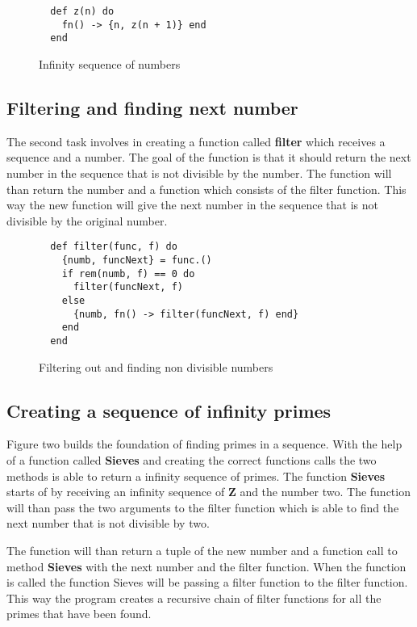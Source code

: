 \documentclass[a4paper,11pt]{article}
\begin{document}
\begin{figure}[H]
\begin{verbatim}
  def z(n) do
    fn() -> {n, z(n + 1)} end
  end
\end{verbatim}
\caption{Infinity sequence of numbers}
\label{Figure:1}
\end{figure}

\subsection*{Filtering and finding next number}
The second task involves in creating a function called \textbf{filter} which receives a sequence and a number. The goal of the function is that it should return the next number in the sequence that is not divisible by the number. The function will than return the number and a function which consists of the filter function. This way the new function will give the next number in the sequence that is not divisible by the original number.

\begin{figure}[H]
\begin{verbatim}
  def filter(func, f) do
    {numb, funcNext} = func.()
    if rem(numb, f) == 0 do
      filter(funcNext, f)
    else
      {numb, fn() -> filter(funcNext, f) end}
    end
  end
\end{verbatim}
\caption{Filtering out and finding non divisible numbers}
\label{Figure:2}
\end{figure}

\subsection*{Creating a sequence of infinity primes}
Figure two builds the foundation of finding primes in a sequence. With the help of a function called \textbf{Sieves} and creating the correct functions calls the two methods is able to return a infinity sequence of primes. The function \textbf{Sieves} starts of by receiving an infinity sequence of \textbf{Z} and the number two. The function will than pass the two arguments to the filter function which is able to find the next number that is not divisible by two.

The function will than return a tuple of the new number and a function call to method \textbf{Sieves} with the next number and the filter function. When the function is called the function Sieves will be passing a filter function to the filter function. This way the program creates a recursive chain of filter functions for all the primes that have been found.
\end{document}
